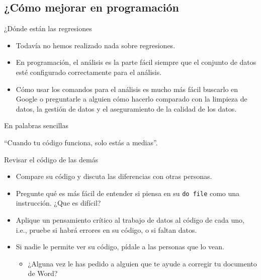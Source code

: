 \documentclass[11pt, aspectratio=169, compress]{beamer}
\begin{document}
\subsection{¿Cómo mejorar en programación}
\begin{frame}{¿Dónde están las regresiones}
	\begin{itemize}
		\item Todavía no hemos realizado nada sobre regresiones. 
		\item En programación, el análisis es la parte fácil siempre que el conjunto de datos esté configurado correctamente para el análisis.
		\item Cómo usar los comandos para el análisis es mucho más fácil buscarlo en Google o preguntarle a alguien cómo hacerlo comparado con  la limpieza de datos, la gestión de datos y el aseguramiento de la calidad de los datos.
	\end{itemize}
\end{frame}
\begin{frame}{En palabras sencillas}
	\begin{center}
		``Cuando tu código funciona, solo estás a medias''. 
	\end{center}
\end{frame}
\begin{frame}{Revisar el código de las demás}
	\begin{itemize}
		\item Compare su código y discuta las diferencias con otras personas.
		\item Pregunte qué es más fácil de entender si piensa en su \texttt{do file} como una instrucción. ¿Que es difícil?
		\item Aplique un pensamiento crítico al trabajo de datos al código de cada uno, i.e., pruebe si habrá errores en su código, o si faltan datos.
		\item Si nadie le permite ver su código, pídale a las personas que lo vean. 
		\begin{itemize}
			\item ¿Alguna vez le has pedido a alguien que te ayude a corregir tu documento de Word?
		\end{itemize}
	\end{itemize}
\end{frame}
\end{document}
